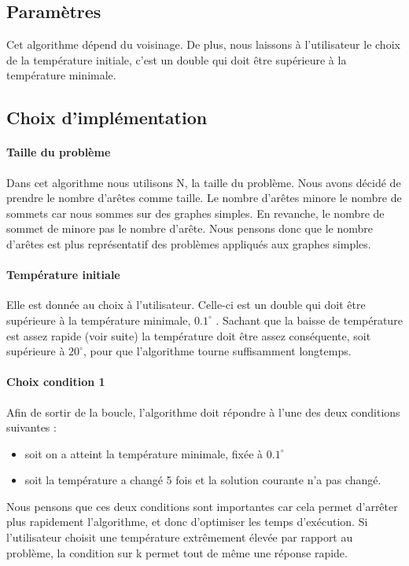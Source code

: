 \documentclass[12pt]{article}
\begin{document}
\subsection{Paramètres}
Cet algorithme dépend du voisinage. De plus, nous laissons à l’utilisateur le choix de la température initiale, c’est un double qui doit être supérieure à la température minimale.

\subsection{Choix d'implémentation}

\paragraph{Taille du problème}
Dans cet algorithme nous utilisons N, la taille du problème. Nous avons décidé de prendre le nombre d'arêtes comme taille. Le nombre d’arêtes minore le nombre de sommets car nous sommes sur des graphes simples. En revanche, le nombre de sommet de minore pas le nombre d'arête. Nous pensons donc que le nombre d’arêtes est plus représentatif des problèmes appliqués aux graphes simples.

\paragraph{Température initiale} Elle est donnée au choix à l’utilisateur. Celle-ci est un double qui doit être supérieure à la température minimale, $0.1^\circ$ . Sachant que la baisse de température est assez rapide (voir suite) la température doit être assez conséquente, soit supérieure à $20^\circ$, pour que l’algorithme tourne suffisamment longtemps.

\paragraph{Choix condition 1} Afin de sortir de la boucle, l’algorithme doit répondre à l’une des deux conditions suivantes :
	\begin{itemize}
    \item soit on a atteint la température minimale, fixée à $0.1^\circ$
    \item soit la température a changé 5 fois et la solution courante n’a pas changé.
    \end{itemize}

Nous pensons que ces deux conditions sont importantes car cela permet d'arrêter plus rapidement l'algorithme, et donc d’optimiser les temps d’exécution. Si l’utilisateur choisit une température extrêmement élevée par rapport au problème, la condition sur k permet tout de même une réponse rapide.
\end{document}
